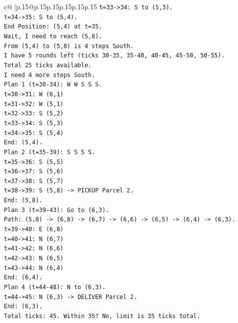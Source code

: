 \documentclass{article}
\begin{document}
{\begin{supertabular}{c@{$\;$}|p{.15\linewidth}@{}p{.15\linewidth}p{.15\linewidth}p{.15\linewidth}p{.15\linewidth}p{.15\linewidth}}
{{{\texttt{t=33{-}>34: S to (5,3).} \\
\texttt{t=34{-}>35: S to (5,4).} \\
\texttt{End Position: (5,4) at t=35.} \\
\texttt{Wait, I need to reach (5,8).} \\
\texttt{From (5,4) to (5,8) is 4 steps South.} \\
\texttt{I have 5 rounds left (ticks 30{-}35, 35{-}40, 40{-}45, 45{-}50, 50{-}55).} \\
\texttt{Total 25 ticks available.} \\
\texttt{I need 4 more steps South.} \\
\texttt{Plan 1 (t=30{-}34): W W S S S.} \\
\texttt{t=30{-}>31: W (6,1)} \\
\texttt{t=31{-}>32: W (5,1)} \\
\texttt{t=32{-}>33: S (5,2)} \\
\texttt{t=33{-}>34: S (5,3)} \\
\texttt{t=34{-}>35: S (5,4)} \\
\texttt{End: (5,4).} \\
\texttt{Plan 2 (t=35{-}39): S S S S.} \\
\texttt{t=35{-}>36: S (5,5)} \\
\texttt{t=36{-}>37: S (5,6)} \\
\texttt{t=37{-}>38: S (5,7)} \\
\texttt{t=38{-}>39: S (5,8) {-}> PICKUP Parcel 2.} \\
\texttt{End: (5,8).} \\
\texttt{Plan 3 (t=39{-}43): Go to (6,3).} \\
\texttt{Path: (5,8) {-}> (6,8) {-}> (6,7) {-}> (6,6) {-}> (6,5) {-}> (6,4) {-}> (6,3).} \\
\texttt{t=39{-}>40: E (6,8)} \\
\texttt{t=40{-}>41: N (6,7)} \\
\texttt{t=41{-}>42: N (6,6)} \\
\texttt{t=42{-}>43: N (6,5)} \\
\texttt{t=43{-}>44: N (6,4)} \\
\texttt{End: (6,4).} \\
\texttt{Plan 4 (t=44{-}48): N to (6,3).} \\
\texttt{t=44{-}>45: N (6,3) {-}> DELIVER Parcel 2.} \\
\texttt{End: (6,3).} \\
\texttt{Total ticks: 45. Within 35? No, limit is 35 ticks total.} \\
}}}
\end{supertabular}}
\end{document}
